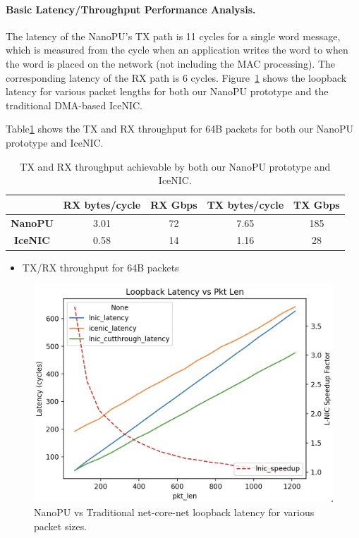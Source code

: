 \paragraph{Basic Latency/Throughput Performance Analysis.} The latency of the NanoPU's TX path is 11 cycles for a single word message, which is measured from the cycle when an application writes the word to when the word is placed on the network (not including the MAC processing).
The corresponding latency of the RX path is 6 cycles.
Figure~\ref{fig:loopback-latency} shows the loopback latency for various packet lengths for both our NanoPU prototype and the traditional DMA-based IceNIC.

Table\ref{tab:throughput} shows the TX and RX throughput for 64B packets for both our NanoPU prototype and IceNIC. 

\begin{table}[]
\begin{center}
\begin{tabular}{|c|c|c|c|c|}
\hline
                & \textbf{RX bytes/cycle} & \textbf{RX Gbps} & \textbf{TX bytes/cycle} & \textbf{TX Gbps} \\ \hline
\textbf{NanoPU} & 3.01                    & 72               & 7.65                    & 185              \\ \hline
\textbf{IceNIC} & 0.58                    & 14               & 1.16                    & 28               \\ \hline
\end{tabular}
\caption{TX and RX throughput achievable by both our NanoPU prototype and IceNIC.}
\label{tab:throughput}
\end{center}
\end{table}

\begin{itemize}
    \item TX/RX throughput for 64B packets
\end{itemize}

\begin{figure}
  \includegraphics[width=\linewidth]{./figures/loopback-latency}
  \caption{NanoPU vs Traditional net-core-net loopback latency for various packet sizes.}
  \label{fig:loopback-latency}
\end{figure}

